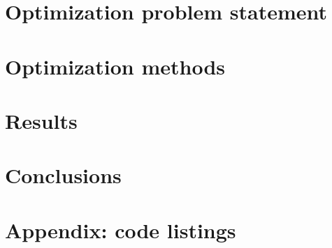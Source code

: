 \documentclass[11pt]{article}
\begin{document}
\section{Optimization problem statement}

\section{Optimization methods}

\section{Results}

\section{Conclusions}

\newpage

\section{Appendix: code listings}



\newpage


\newpage


\newpage


\newpage

\end{document}
